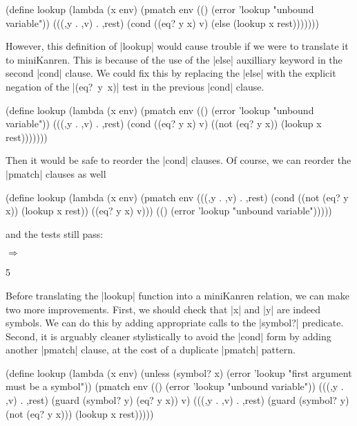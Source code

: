 \begin{schemedisplay}
(define lookup
  (lambda (x env)
    (pmatch env
      (() (error 'lookup "unbound variable"))
      (((,y . ,v) . ,rest)
       (cond
         ((eq? y x) v)
         (else (lookup x rest)))))))
\end{schemedisplay}

However, this definition of \scheme|lookup| would cause trouble if we
were to translate it to miniKanren.  This is because of the use of the
\scheme|else| auxilliary keyword in the second \scheme|cond| clause.
We could fix this by replacing the \scheme|else| with the explicit
negation of the \mbox{\scheme|(eq? y x)|} test in the previous
\scheme|cond| clause.

\begin{schemedisplay}
(define lookup
  (lambda (x env)
    (pmatch env
      (() (error 'lookup "unbound variable"))
      (((,y . ,v) . ,rest)
       (cond
         ((eq? y x) v)
         ((not (eq? y x)) (lookup x rest)))))))
\end{schemedisplay}

Then it would be safe to reorder the \scheme|cond| clauses.  Of
course, we can reorder the \scheme|pmatch| clauses as well

\begin{schemedisplay}
(define lookup
  (lambda (x env)
    (pmatch env
      (((,y . ,v) . ,rest)
       (cond
         ((not (eq? y x)) (lookup x rest))
         ((eq? y x) v)))
      (() (error 'lookup "unbound variable")))))
\end{schemedisplay}

and the tests still pass:

\noindent{} $\Rightarrow$
\begin{schemeresponsebox}5\end{schemeresponsebox}

Before translating the \scheme|lookup| function into a miniKanren
relation, we can make two more improvements.  First, we should check
that \scheme|x| and \scheme|y| are indeed symbols.  We can do this by
adding appropriate calls to the \scheme|symbol?| predicate.  Second,
it is arguably cleaner stylistically to avoid the \scheme|cond| form
by adding another \scheme|pmatch| clause, at the cost of a duplicate
\scheme|pmatch| pattern.

\begin{schemedisplay}
(define lookup
  (lambda (x env)
    (unless (symbol? x)
      (error 'lookup "first argument must be a symbol"))
    (pmatch env
      (() (error 'lookup "unbound variable"))
      (((,y . ,v) . ,rest) (guard (symbol? y) (eq? y x))
       v)
      (((,y . ,v) . ,rest) (guard (symbol? y) (not (eq? y x)))
       (lookup x rest)))))
\end{schemedisplay}

